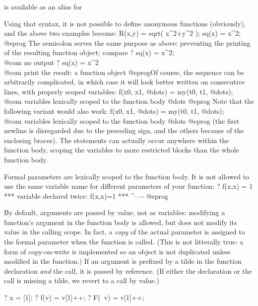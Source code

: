 \noindent is available as an alias for


\noindent Using that syntax, it is not possible to define anonymous functions
(obviously), and the above two examples become:
\bprog
R(x,y) = sqrt( x^2+y^2 );
sq(x) = x^2;
@eprog\noindent
The semicolon serves the same purpose as above: preventing the printing
of the resulting function object; compare
\bprog
? sq(x) = x^2;  \\@com no output
? sq(x) = x^2   \\@com print the result: a function object
@eprog\noindent Of course, the sequence  can be arbitrarily
complicated, in which case it will look better written on consecutive lines,
with properly scoped variables:
\bprog
{
f(x0, x1, @dots) =
  my(t0, t1, @dots); \\@com variables lexically scoped to the function body
  @dots
}
@eprog \noindent Note that the following variant would also work:
\bprog
f(x0, x1, @dots) =
{
  my(t0, t1, @dots); \\@com variables lexically scoped to the function body
  @dots
}
@eprog \noindent
(the first newline is disregarded due to the preceding \kbd{=} sign, and the
others because of the enclosing braces). The  statements can actually
occur anywhere within the function body, scoping the variables to more
restricted blocks than the whole function body.

Formal parameters are lexically scoped to the function body. It is not
allowed to use the same variable name for different parameters of your
function:
\bprog
? f(x,x) = 1
  ***   variable declared twice: f(x,x)=1
  ***                                ^----
@eprog

By default, arguments are passed by value, not as variables: modifying a
function's argument in the function body is allowed, but does not modify its
value in the calling scope. In fact, a \emph{copy} of the actual parameter is
assigned to the formal parameter when the function is called. (This is not
litterally true: a form of copy-on-write is implemented so an object is not
duplicated unless modified in the function.) If an argument is prefixed by a
tilde \kbd{\til} in the function declaration \emph{and} the call, it is
passed by reference. (If either the declaration or the call is missing
a tilde, we revert to a call by value.)

\bprog
  ? x = [1];
  ? f(v)  = v[1]++;
  ? F(~v) = v[1]++;

